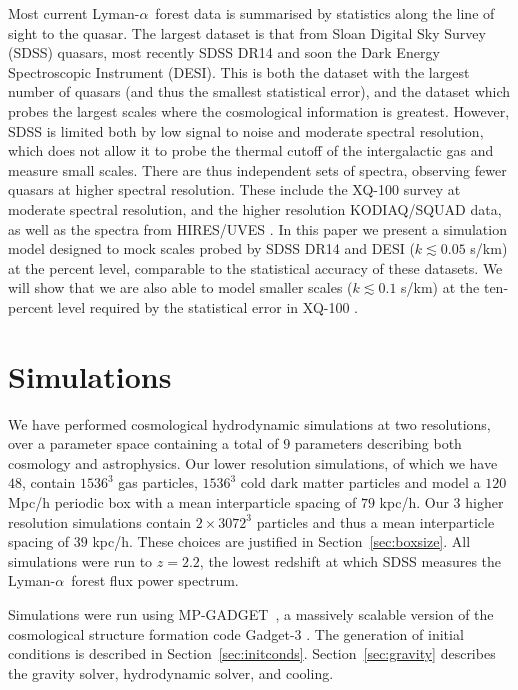 \documentclass[a4paper,11pt]{article}
\newcommand{\Lya}{Lyman-$\alpha$}
\newcommand{\mpgadget}{{\small MP-GADGET}}
\begin{document}
Most current \Lya~forest data is summarised by statistics along the line of sight to the quasar. The largest dataset is that from Sloan Digital Sky Survey (SDSS) quasars, most recently SDSS DR14 \cite{Chabanier:2019} and soon the Dark Energy Spectroscopic Instrument (DESI). This is both the dataset with the largest number of quasars (and thus the smallest statistical error), and the dataset which probes the largest scales where the cosmological information is greatest. However, SDSS is limited both by low signal to noise and moderate spectral resolution, which does not allow it to probe the thermal cutoff of the intergalactic gas and measure small scales. There are thus independent sets of spectra, observing fewer quasars at higher spectral resolution. These include the XQ-100 survey \cite{Irsic:2017pk, Esposito:2022} at moderate spectral resolution, and the higher resolution KODIAQ/SQUAD \cite{KODIAQ:2022} data, as well as the spectra from HIRES/UVES \cite{Viel:2013wdm, Boera:2019}. In this paper we present a simulation model designed to mock scales probed by SDSS DR14 and DESI ($k \lesssim 0.05$ s/km) at the percent level, comparable to the statistical accuracy of these datasets. We will show that we are also able to model smaller scales ($k \lesssim 0.1$ s/km) at the ten-percent level required by the statistical error in XQ-100 \cite{KODIAQ:2022}.

\section{Simulations}

We have performed cosmological hydrodynamic simulations at two resolutions, over a parameter space containing a total of $9$ parameters describing both cosmology and astrophysics. Our lower resolution simulations, of which we have $48$, contain $1536^3$ gas particles, $1536^3$ cold dark matter particles and model a $120$ Mpc/h periodic box with a mean interparticle spacing of $79$ kpc/h. Our $3$ higher resolution simulations contain $2\times 3072^3$ particles and thus a mean interparticle spacing of $39$ kpc/h. These choices are justified in Section~\ref{sec:boxsize}. All simulations were run to $z=2.2$, the lowest redshift at which SDSS measures the \Lya~forest flux power spectrum.

Simulations were run using \mpgadget~\cite{MPGadget2018, Bird:2022}, a massively scalable version of the cosmological structure formation code Gadget-3 \cite{Springel:2005}. The generation of initial conditions is described in Section~\ref{sec:initconds}. Section~\ref{sec:gravity} describes the gravity solver, hydrodynamic solver, and cooling.
\end{document}
